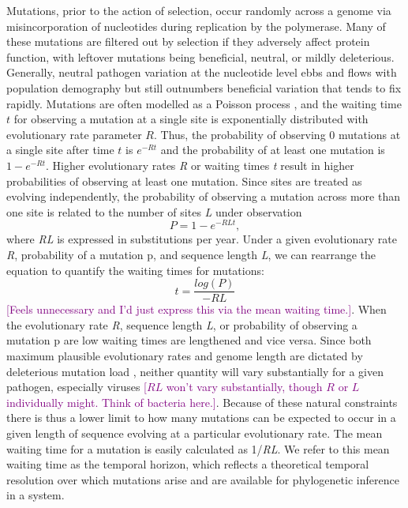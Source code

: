 \documentclass[11pt,oneside,letterpaper]{article}
\def\tbc#1{\textcolor{purple}{[#1]}}
\begin{document}
Mutations, prior to the action of selection, occur randomly across a genome via misincorporation of nucleotides during replication by the polymerase.
Many of these mutations are filtered out by selection if they adversely affect protein function, with leftover mutations being beneficial, neutral, or mildly deleterious.
Generally, neutral pathogen variation at the nucleotide level ebbs and flows with population demography but still outnumbers beneficial variation that tends to fix rapidly.
Mutations are often modelled as a Poisson process \citep{yang_computational_2006}, and the waiting time $t$ for observing a mutation at a single site is exponentially distributed with evolutionary rate parameter $R$.
Thus, the probability of observing 0 mutations at a single site after time $t$ is $e^{-Rt}$ and the probability of at least one mutation is $1-e^{-Rt}$.
Higher evolutionary rates \textit{R} or waiting times \textit{t} result in higher probabilities of observing at least one mutation.
Since sites are treated as evolving independently, the probability of observing a mutation across more than one site is related to the number of sites \textit{L} under observation
\begin{equation}
  P = 1-e^{-RLt},
\end{equation}
where \textit{RL} is expressed in substitutions per year.
Under a given evolutionary rate \textit{R}, probability of a mutation p, and sequence length \textit{L}, we can rearrange the equation to quantify the waiting times for mutations:
\begin{equation}
  t = \frac{log(P)}{-RL}
\end{equation}
\tbc{Feels unnecessary and I'd just express this via the mean waiting time.}.
When the evolutionary rate \textit{R}, sequence length \textit{L}, or probability of observing a mutation p are low waiting times are lengthened and vice versa.
Since both maximum plausible evolutionary rates and genome length are dictated by deleterious mutation load \citep{gago_extremely_2009}, neither quantity will vary substantially for a given pathogen, especially viruses \tbc{$RL$ won't vary substantially, though $R$ or $L$ individually might. Think of bacteria here.}.
Because of these natural constraints there is thus a lower limit to how many mutations can be expected to occur in a given length of sequence evolving at a particular evolutionary rate.
The mean waiting time for a mutation is easily calculated as 1/\textit{RL}.
We refer to this mean waiting time as the temporal horizon, which reflects a theoretical temporal resolution over which mutations arise and are available for phylogenetic inference in a system.
\end{document}
